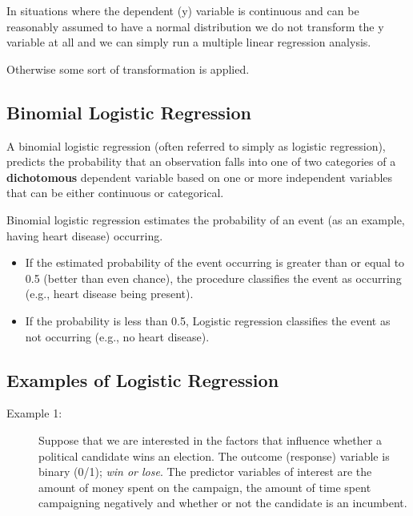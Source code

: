 \documentclass[a4paper,12pt]{article}
\begin{document}
{In situations where the dependent (y) variable is continuous and can be
reasonably assumed to have a normal distribution we do not transform the y
variable at all and we can simply run a multiple linear regression analysis.

Otherwise some sort of transformation is applied.


\subsection{Binomial Logistic Regression} 
A binomial logistic regression (often referred to simply as logistic regression), predicts the probability that an observation falls into one of two categories of a \textbf{dichotomous} dependent variable based on one or more independent variables that can be either continuous or categorical.

Binomial logistic regression estimates the probability of an event (as an example, having heart disease) occurring. 
\begin{itemize}
	\item If the estimated probability of the event occurring is greater than or equal to 0.5 (better than even chance), the procedure classifies the event as occurring (e.g., heart disease being present). \item If the probability is less than 0.5, Logistic regression classifies the event as not occurring (e.g., no heart disease). 
\end{itemize}

\subsection{Examples of Logistic Regression}

\begin{description}
	\item[Example 1:]  Suppose that we are interested in the factors that influence whether a political candidate wins an election.  The outcome (response) variable is binary (0/1); \textit{ win or lose}.  The predictor variables of interest are the amount of money spent on the campaign, the amount of time spent campaigning negatively and whether or not the candidate is an incumbent.
	

\end{description}}
\end{document}
